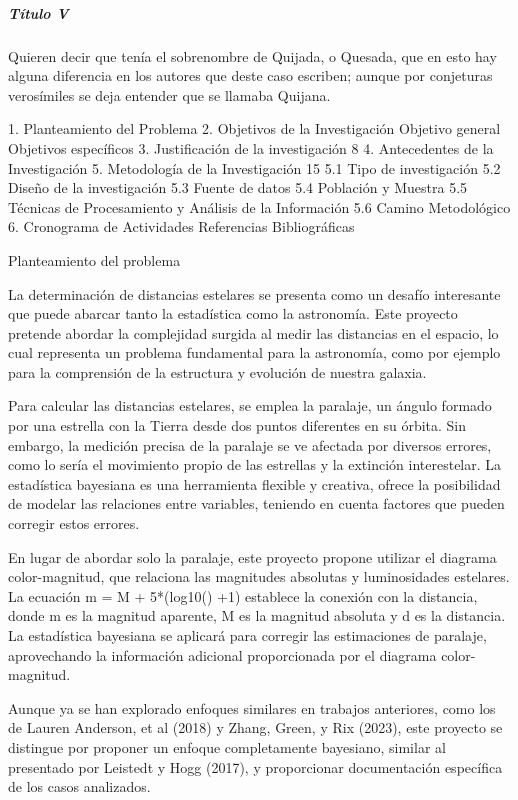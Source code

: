 \documentclass[stu, 12pt, letterpaper, donotrepeattitle, floatsintext, natbib]{apa7}
\begin{document}
\subparagraph{Título V}
Quieren decir que tenía el sobrenombre de Quijada, 
o Quesada, que en esto hay alguna diferencia en los autores 
que deste caso escriben; aunque por conjeturas verosímiles 
se deja entender que se llamaba Quijana.

1.	Planteamiento del Problema	
2.	Objetivos de la Investigación	
Objetivo general	
Objetivos específicos	
3.	Justificación de la investigación	8
4.	Antecedentes de la Investigación	
5.	Metodología de la Investigación	15
5.1 Tipo de investigación	
5.2 Diseño de la investigación	
5.3 Fuente de datos	
5.4 Población y Muestra	
5.5 Técnicas de Procesamiento y Análisis de la Información	
5.6 Camino Metodológico	
6.	Cronograma de Actividades	
Referencias Bibliográficas	

Planteamiento del problema

La determinación de distancias estelares se presenta como un 
desafío interesante que puede abarcar tanto la estadística 
como la astronomía. Este proyecto pretende abordar la 
complejidad surgida al medir las distancias en el espacio, 
lo cual representa un problema fundamental para la astronomía, 
como por ejemplo para la comprensión de la estructura y evolución 
de nuestra galaxia.

Para calcular las distancias estelares, se emplea la paralaje, 
un ángulo formado por una estrella con la Tierra desde dos puntos 
diferentes en su órbita. Sin embargo, la medición precisa de la paralaje 
se ve afectada por diversos errores, como lo sería el movimiento propio 
de las estrellas y la extinción interestelar. La estadística bayesiana 
es una herramienta flexible y creativa, ofrece la posibilidad de modelar 
las relaciones entre variables, teniendo en cuenta factores que pueden 
corregir estos errores.

En lugar de abordar solo la paralaje, este proyecto propone utilizar 
el diagrama color-magnitud, que relaciona las magnitudes absolutas y 
luminosidades estelares. La ecuación  m = M + 5*(log10() +1) establece 
la conexión con la distancia, donde m es la magnitud aparente, M es la 
magnitud absoluta y d es la distancia. La estadística bayesiana se 
aplicará para corregir las estimaciones de paralaje, aprovechando 
la información adicional proporcionada por el diagrama color-magnitud.

Aunque ya se han explorado enfoques similares en trabajos anteriores, 
como los de Lauren Anderson, et al (2018) y Zhang, Green, y Rix (2023), 
este proyecto se distingue por proponer un enfoque completamente bayesiano, 
similar al presentado por Leistedt y Hogg (2017), y proporcionar documentación 
específica de los casos analizados.
\end{document}
